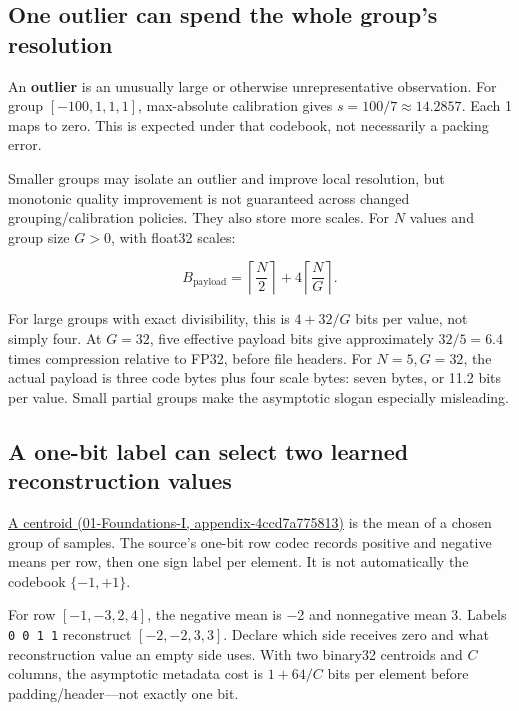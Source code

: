 \subsection{One outlier can spend the whole group's resolution}\label{05-engine-i-ch001-one-outlier-can-spend-the-whole-groups-resolution}

An \textbf{outlier} is an unusually large or otherwise unrepresentative observation. For group \([-100,1,1,1]\), max-absolute calibration gives \(s=100/7\approx14.2857\). Each 1 maps to zero. This is expected under that codebook, not necessarily a packing error.

Smaller groups may isolate an outlier and improve local resolution, but monotonic quality improvement is not guaranteed across changed grouping/calibration policies. They also store more scales. For \(N\) values and group size \(G>0\), with float32 scales:

\[
B_{\mathrm{payload}}=
\left\lceil\frac N2\right\rceil
+4\left\lceil\frac NG\right\rceil.
\]

For large groups with exact divisibility, this is \(4+32/G\) bits per value, not simply four. At \(G=32\), five effective payload bits give approximately \(32/5=6.4\) times compression relative to FP32, before file headers. For \(N=5,G=32\), the actual payload is three code bytes plus four scale bytes: seven bytes, or 11.2 bits per value. Small partial groups make the asymptotic slogan especially misleading.

\subsection{A one-bit label can select two learned reconstruction values}\label{05-engine-i-ch001-a-one-bit-label-can-select-two-learned-reconstruction-values}

\href{../01-Foundations-I/main.pdf\#nameddest=appendix-4ccd7a775813}{A centroid (01-Foundations-I, appendix-4ccd7a775813)} is the mean of a chosen group of samples. The source's one-bit row codec records positive and negative means per row, then one sign label per element. It is not automatically the codebook \(\{-1,+1\}\).

For row \([-1,-3,2,4]\), the negative mean is −2 and nonnegative mean 3. Labels \texttt{0\ 0\ 1\ 1} reconstruct \([-2,-2,3,3]\). Declare which side receives zero and what reconstruction value an empty side uses. With two binary32 centroids and \(C\) columns, the asymptotic metadata cost is \(1+64/C\) bits per element before padding/header---not exactly one bit.

